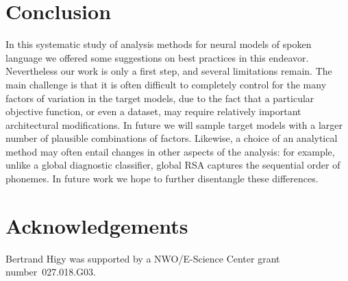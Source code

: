 \section{Conclusion}
\label{sec:conclusion}
In this systematic study of analysis methods for neural models of
spoken language we offered some suggestions on best practices in this
endeavor. Nevertheless our work is only a first step, and several
limitations remain. The main challenge is that it is often difficult
to completely control for the many factors of variation in the target
models, due to the fact that a particular objective function, or even
a dataset, may require relatively important architectural
modifications. In future we will sample target models with a larger
number of plausible combinations of factors. Likewise, a choice of an
analytical method may often entail changes in other aspects of the
analysis: for example, unlike a global diagnostic classifier, global
RSA captures the sequential order of phonemes.  In future work we hope
to further disentangle these differences.

\section*{Acknowledgements}
Bertrand Higy was supported by a NWO/E-Science Center grant
number~027.018.G03.

